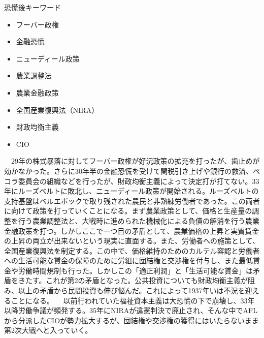 \documentclass{jsarticle}
\begin{document}
恐慌後キーワード
\begin{itemize}
\item フーバー政権
\item 金融恐慌
\item ニューディール政策
\item 農業調整法
\item 農業金融政策
\item 全国産業復興法（NIRA）
\item 財政均衡主義
\item CIO
\end{itemize}
　29年の株式暴落に対してフーバー政権が好況政策の拡充を打ったが、歯止めが効かなかった。さらに30年半の金融恐慌を受けて関税引き上げや銀行の救済、ペコラ委員会の組織などを行ったが、財政均衡主義によって決定打が打てない。33年にルーズベルトに敗北し、ニューディール政策が開始される。ルーズベルトの支持基盤はベルエポックで取り残された農民と非熟練労働者であった。この両者に向けて政策を打っていくことになる。まず農業政策として、価格と生産量の調整を行う農業調整法と、大戦時に進められた機械化による負債の解消を行う農業金融政策を打つ。しかしここで一つ目の矛盾として、農業価格の上昇と実質賃金の上昇の両立が出来ないという現実に直面する。また、労働者への施策として、全国産業復興法を制定する。この中で、価格維持のためのカルテル容認と労働者への生活可能な賃金の保障のために労組に団結権と交渉権を付与し、また最低賃金や労働時間規制も行った。しかしこの「適正利潤」と「生活可能な賃金」は矛盾をきたす。これが第2の矛盾となった。公共投資についても財政均衡主義が阻み、以上の矛盾から民間投資も伸び悩んだ。これによって1937年いは不況を迎えることになる。
　以前行われていた福祉資本主義は大恐慌の下で崩壊し、33年以降労働争議が頻発する。35年にNIRAが違憲判決で廃止され、そんな中でAFLから分派したCIOが勢力拡大するが、団結権や交渉権の獲得にはいたらないまま第2次大戦へと入っていく。
\end{document}
